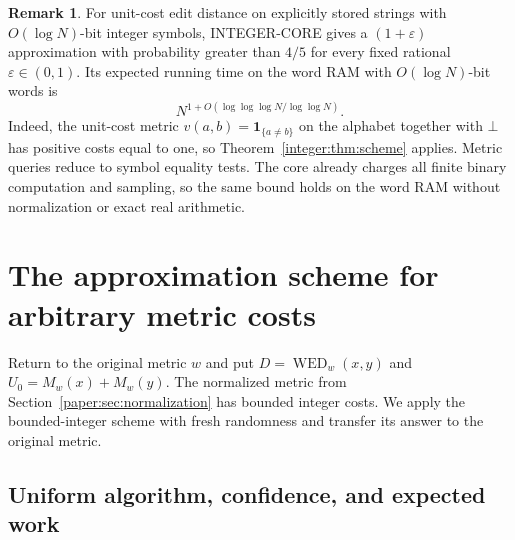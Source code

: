 \documentclass[11pt]{article}
\theoremstyle{definition}
\newtheorem{remark}[theorem]{Remark}
\newcommand{\WED}{\operatorname{WED}}
\newcommand{\gap}{\bot}
\newcommand{\1}{\mathbf 1}
\begin{document}
\begin{remark}\label{integer:rem:unitcost}
For unit-cost edit distance on explicitly stored strings with
$O(\log N)$-bit integer symbols, INTEGER-CORE gives a
$(1+\varepsilon)$ approximation with probability greater than $4/5$
for every fixed rational $\varepsilon\in(0,1)$. Its expected running
time on the word RAM with $O(\log N)$-bit words is
\[
 N^{1+O(\log\log\log N/\log\log N)}.
\]
Indeed, the unit-cost metric $v(a,b)=\mathbf1_{\{a\ne b\}}$ on the
alphabet together with $\gap$ has positive costs equal to one, so
Theorem~\ref{integer:thm:scheme} applies. Metric queries reduce to
symbol equality tests. The core already charges all finite binary
computation and sampling, so the same bound holds on the word RAM
without normalization or exact real arithmetic.
\end{remark}

\FloatBarrier

\section{The approximation scheme for arbitrary metric costs}\label{paper:sec:general}

Return to the original metric $w$ and put $D=\WED_w(x,y)$ and
$U_0=M_w(x)+M_w(y)$. The normalized metric from
Section~\ref{paper:sec:normalization} has bounded integer costs.
We apply the bounded-integer scheme with fresh randomness and transfer
its answer to the original metric.

\subsection{Uniform algorithm, confidence, and expected work}
\end{document}
